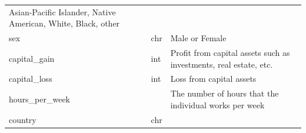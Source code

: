 \documentclass[]{article}
\begin{document}
\begin{longtable}[]{@{}lll@{}}
\begin{minipage}[t]{0.26\columnwidth}
Asian-Pacific Islander, Native American, White, Black, other\strut
\end{minipage}\tabularnewline
\begin{minipage}[t]{0.35\columnwidth}\raggedright
sex\strut
\end{minipage} & \begin{minipage}[t]{0.30\columnwidth}\raggedright
chr\strut
\end{minipage} & \begin{minipage}[t]{0.26\columnwidth}\raggedright
Male or Female\strut
\end{minipage}\tabularnewline
\begin{minipage}[t]{0.35\columnwidth}\raggedright
capital\_gain\strut
\end{minipage} & \begin{minipage}[t]{0.30\columnwidth}\raggedright
int\strut
\end{minipage} & \begin{minipage}[t]{0.26\columnwidth}\raggedright
Profit from capital assets such as investments, real estate, etc.\strut
\end{minipage}\tabularnewline
\begin{minipage}[t]{0.35\columnwidth}\raggedright
capital\_loss\strut
\end{minipage} & \begin{minipage}[t]{0.30\columnwidth}\raggedright
int\strut
\end{minipage} & \begin{minipage}[t]{0.26\columnwidth}\raggedright
Loss from capital assets\strut
\end{minipage}\tabularnewline
\begin{minipage}[t]{0.35\columnwidth}\raggedright
hours\_per\_week\strut
\end{minipage} & \begin{minipage}[t]{0.30\columnwidth}\raggedright
\strut
\end{minipage} & \begin{minipage}[t]{0.26\columnwidth}\raggedright
The number of hours that the individual works per week\strut
\end{minipage}\tabularnewline
\begin{minipage}[t]{0.35\columnwidth}\raggedright
country\strut
\end{minipage} & \begin{minipage}[t]{0.30\columnwidth}\raggedright
chr\strut
\end{minipage} & \begin{minipage}[t]{0.26\columnwidth}\raggedright

\end{minipage}
\end{longtable}
\end{document}
